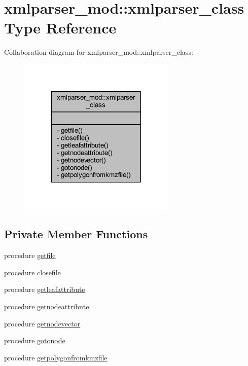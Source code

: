 \hypertarget{structxmlparser__mod_1_1xmlparser__class}{}\section{xmlparser\+\_\+mod\+:\+:xmlparser\+\_\+class Type Reference}
\label{structxmlparser__mod_1_1xmlparser__class}


Collaboration diagram for xmlparser\+\_\+mod\+:\+:xmlparser\+\_\+class\+:\nopagebreak
\begin{figure}[H]
\begin{center}
\leavevmode
\includegraphics[width=212pt]{structxmlparser__mod_1_1xmlparser__class__coll__graph}
\end{center}
\end{figure}
\subsection*{Private Member Functions}
\begin{DoxyCompactItemize}
\item 
procedure \mbox{\hyperlink{structxmlparser__mod_1_1xmlparser__class_a8e0ad8c206828eeefb790224078a66a0}{getfile}}
\item 
procedure \mbox{\hyperlink{structxmlparser__mod_1_1xmlparser__class_a4591b4aad89a5dc75d3e2c0a338b916a}{closefile}}
\item 
procedure \mbox{\hyperlink{structxmlparser__mod_1_1xmlparser__class_a2fef6b1f3d8c3daf38f6d82b87abc4e5}{getleafattribute}}
\item 
procedure \mbox{\hyperlink{structxmlparser__mod_1_1xmlparser__class_a75892404ed305fb3587e02733c8cb19c}{getnodeattribute}}
\item 
procedure \mbox{\hyperlink{structxmlparser__mod_1_1xmlparser__class_ae64ee0cd25265d052136c131bc62edd9}{getnodevector}}
\item 
procedure \mbox{\hyperlink{structxmlparser__mod_1_1xmlparser__class_ab8393d12a17d3409c136cdf29d0463b2}{gotonode}}
\item 
procedure \mbox{\hyperlink{structxmlparser__mod_1_1xmlparser__class_a9682aa628f2166f690e997cc791d8ea6}{getpolygonfromkmzfile}}
\end{DoxyCompactItemize}


